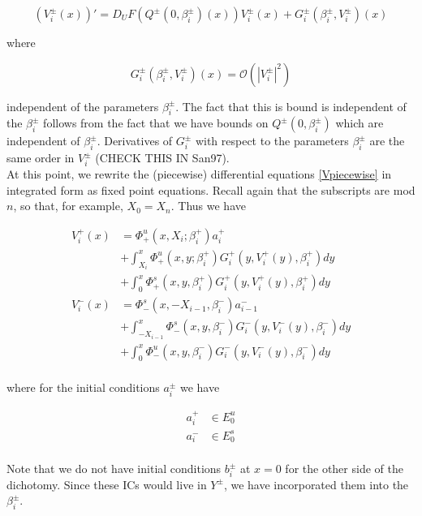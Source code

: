 \documentclass[12pt]{article}
\begin{document}
\begin{equation}\label{Vpiecewise}
(V_i^\pm(x))' = D_U F(Q^\pm(0, \beta_i^\pm)(x)) V_i^\pm(x)  + G_i^\pm(\beta_i^\pm, V_i^\pm)(x)
\end{equation}

where 

\begin{equation}\label{Gquadratic}
G_i^\pm(\beta_i^\pm, V_i^\pm)(x) = \mathcal{O}(|V_i^\pm|^2)
\end{equation}

independent of the parameters $\beta_i^\pm$. The fact that this is bound is independent of the $\beta_i^\pm$ follows from the fact that we have bounds on $Q^\pm(0, \beta_i^\pm)$ which are independent of $\beta_i^\pm$. Derivatives of $G_i^\pm$ with respect to the parameters $\beta_i^\pm$ are the same order in $V_i^\pm$ (CHECK THIS IN San97).\\

At this point, we rewrite the (piecewise) differential equations \eqref{Vpiecewise} in integrated form as fixed point equations. Recall again that the subscripts are mod $n$, so that, for example, $X_0 = X_n$. Thus we have

\begin{align*}
V_i^+(x) &= \Phi^u_+(x, X_i; \beta_i^+) a_i^+  \\
&+ \int_{X_i}^x \Phi_+^u(x, y; \beta_i^+) G_i^+(y, V_i^+(y),\beta_i^+)dy \\
&+ \int_0^x \Phi_+^s(x, y, \beta_i^+) G_i^+(y, V_i^+(y),\beta_i^+)dy \\ 
V_i^-(x) &= \Phi^s_-(x, -X_{i-1}, \beta_i^-) a_{i-1}^-  \\
&+ \int_{-X_{i-1}}^x \Phi_-^s(x, y, \beta_i^-) G_i^-(y, V_i^-(y),\beta_i^-)dy \\
&+ \int_0^x \Phi_-^u(x, y, \beta_i^-) G_i^-(y, V_i^-(y),\beta_i^-)dy \\
\end{align*}

where for the initial conditions $a_i^\pm$ we have

\begin{align*}
a_i^+ &\in E_0^u \\
a_i^- &\in E_0^s \\
\end{align*}

Note that we do not have initial conditions $b_i^\pm$ at $x = 0$ for the other side of the dichotomy. Since these ICs would live in $Y^\pm$, we have incorporated them into the $\beta_i^\pm$.\\
\end{document}
